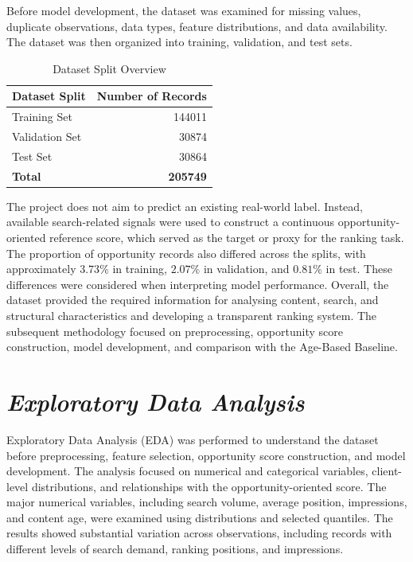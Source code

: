 \documentclass[12pt,a4paper]{report}
\begin{document}
Before model development, the dataset was examined for missing values, duplicate observations, data types, feature distributions, and data availability. The dataset was then organized into training, validation, and test sets.

\begin{table}[htbp]
\centering
\caption{Dataset Split Overview}
\label{tab:dataset_split_overview}
\begin{tabular}{|l|r|}
\hline
\textbf{Dataset Split} & \textbf{Number of Records} \\
\hline
Training Set & 144011 \\
\hline
Validation Set & 30874 \\
\hline
Test Set & 30864 \\
\hline
\textbf{Total} & \textbf{205749} \\
\hline
\end{tabular}
\end{table}

The project does not aim to predict an existing real-world label. Instead, available search-related signals were used to construct a continuous opportunity-oriented reference score, which served as the target or proxy for the ranking task. The proportion of opportunity records also differed across the splits, with approximately $3.73\%$ in training, $2.07\%$ in validation, and $0.81\%$ in test. These differences were considered when interpreting model performance. Overall, the dataset provided the required information for analysing content, search, and structural characteristics and developing a transparent ranking system. The subsequent methodology focused on preprocessing, opportunity score construction, model development, and comparison with the Age-Based Baseline.

\section{\textit{Exploratory Data Analysis}}

Exploratory Data Analysis (EDA) was performed to understand the dataset before preprocessing, feature selection, opportunity score construction, and model development. The analysis focused on numerical and categorical variables, client-level distributions, and relationships with the opportunity-oriented score. The major numerical variables, including search volume, average position, impressions, and content age, were examined using distributions and selected quantiles. The results showed substantial variation across observations, including records with different levels of search demand, ranking positions, and impressions.
\end{document}
